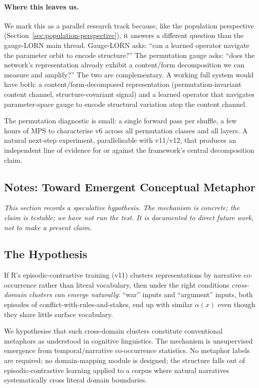 \documentclass[11pt, a4paper]{article}
\theoremstyle{plain}
\theoremstyle{definition}
\theoremstyle{remark}
\begin{document}
\paragraph{Where this leaves us.}
We mark this as a parallel research track because, like the population perspective (Section~\ref{sec:population-perspective}), it answers a different question than the gauge-LORN main thread.
Gauge-LORN asks: ``can a learned operator navigate the parameter orbit to encode structure?''
The permutation gauge asks: ``does the network's representation already exhibit a content/form decomposition we can measure and amplify?''
The two are complementary.
A working full system would have both: a content/form-decomposed representation (permutation-invariant content channel, structure-covariant signal) and a learned operator that navigates parameter-space gauge to encode structural variation atop the content channel.

The permutation diagnostic is small: a single forward pass per shuffle, a few hours of MPS to characterise v6 across all permutation classes and all layers.
A natural next-step experiment, parallelisable with v11/v12, that produces an independent line of evidence for or against the framework's central decomposition claim.


\subsection{Notes: Toward Emergent Conceptual Metaphor}
\label{sec:emergent-metaphor}

\emph{This section records a speculative hypothesis. The mechanism is concrete; the claim is testable; we have not run the test. It is documented to direct future work, not to make a present claim.}

\subsection{The Hypothesis}

If R's episodic-contrastive training (v11) clusters representations by narrative co-occurrence rather than literal vocabulary, then under the right conditions \emph{cross-domain clusters can emerge naturally}: ``war'' inputs and ``argument'' inputs, both episodes of conflict-with-rules-and-stakes, end up with similar $\alpha(x)$ even though they share little surface vocabulary.

We hypothesise that such cross-domain clusters constitute conventional metaphors as understood in cognitive linguistics.
The mechanism is unsupervised emergence from temporal/narrative co-occurrence statistics.
No metaphor labels are required; no domain-mapping module is designed; the structure falls out of episodic-contrastive learning applied to a corpus where natural narratives systematically cross literal domain boundaries.
\end{document}
